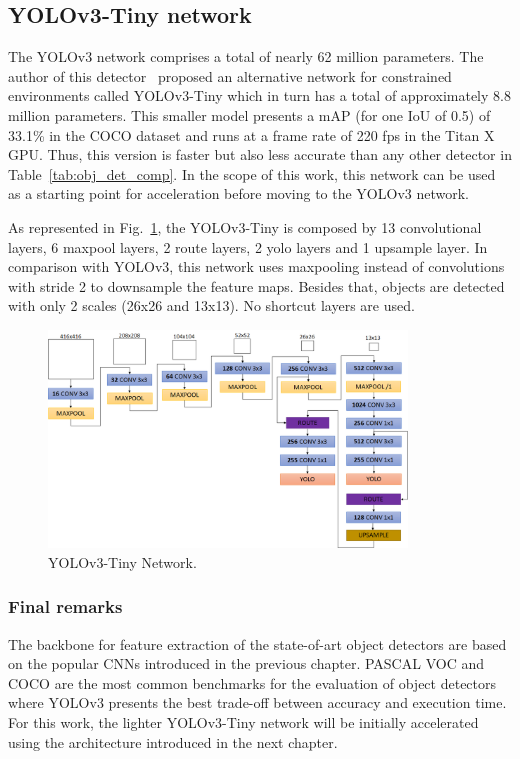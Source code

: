  
\subsection{YOLOv3-Tiny network}

The YOLOv3 network comprises a total of nearly 62 million parameters. The author of this detector~\cite{Redmon2018YOLOv3AI} proposed an alternative network for constrained environments called YOLOv3-Tiny which in turn has a total of approximately 8.8 million parameters. This smaller model presents a mAP (for one IoU of 0.5) of 33.1\% in the COCO dataset and runs at a frame rate of 220 fps in the Titan X GPU. Thus, this version is faster but also less accurate than any other detector in Table~\ref{tab:obj_det_comp}. In the scope of this work, this network can be used as a starting point for acceleration before moving to the YOLOv3 network. 

As represented in Fig.~\ref{fig:yolov3_tiny_ntw}, the YOLOv3-Tiny is composed by 13 convolutional layers, 6 maxpool layers, 2 route layers, 2 yolo layers and 1 upsample layer. In comparison with YOLOv3, this network uses maxpooling instead of convolutions with stride 2 to downsample the feature maps. Besides that, objects are detected with only 2 scales (26x26 and 13x13). No shortcut layers are used.  

\begin{figure}[!htb]
  \centering
  \includegraphics[width=0.85\textwidth]{Figures/tiny.png}
  \caption{YOLOv3-Tiny Network.}
  \label{fig:yolov3_tiny_ntw}
\end{figure}

\subsubsection{Final remarks}

The backbone for feature extraction of the state-of-art object detectors are based on the popular CNNs introduced in the previous chapter. PASCAL VOC and COCO are the most common benchmarks for the evaluation of object detectors where YOLOv3 presents the best trade-off between accuracy and execution time. For this work, the lighter YOLOv3-Tiny network will be initially accelerated using the architecture introduced in the next chapter.   
